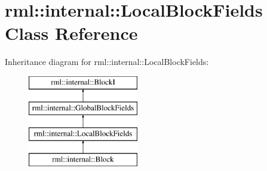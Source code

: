 \hypertarget{classrml_1_1internal_1_1LocalBlockFields}{}\section{rml\+:\+:internal\+:\+:Local\+Block\+Fields Class Reference}
\label{classrml_1_1internal_1_1LocalBlockFields}
Inheritance diagram for rml\+:\+:internal\+:\+:Local\+Block\+Fields\+:\begin{figure}[H]
\begin{center}
\leavevmode
\includegraphics[height=4.000000cm]{classrml_1_1internal_1_1LocalBlockFields}
\end{center}
\end{figure}
